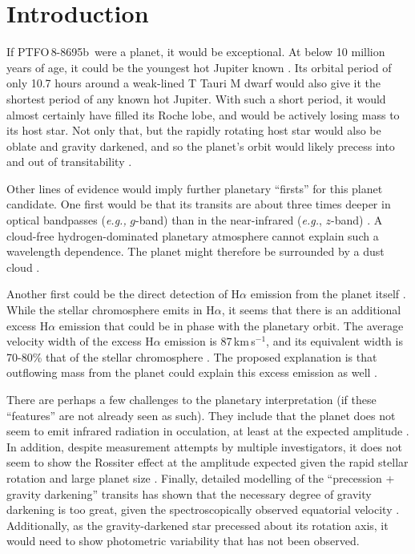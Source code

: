 \documentclass[12pt,twocolumn,tighten]{aastex62}
\newcommand{\ptfob}{PTFO$\,$8-8695b}
\begin{document}

\section{Introduction}
If \ptfob\ were a planet, it would be exceptional.  At below 10
million years of age, it could be the youngest hot Jupiter known
\citep{van_eyken_ptf_2012}.  Its orbital period of only 10.7 hours
around a weak-lined T Tauri M dwarf would also give it the shortest
period of any known hot Jupiter.  With such a short period, it would
almost certainly have filled its Roche lobe, and would be actively
losing mass to its host star.  Not only that, but the rapidly rotating
host star would also be oblate and gravity darkened, and so the
planet's orbit would likely precess into and out of transitability
\citep{barnes_measurement_2013,ciardi_followup_2015,kamiaka_revisiting_2015}. 

Other lines of evidence would imply further planetary ``firsts'' for
this planet candidate.  One first would be that its transits are about
three times deeper in optical bandpasses ({\it e.g.,} $g$-band) than
in the near-infrared ({\it e.g.}, $z$-band)
\citep{onitsuka_multicolor_2017,tanimoto_evidence_2020}.  A cloud-free
hydrogen-dominated planetary atmosphere cannot explain such a
wavelength dependence.  The planet might therefore be surrounded by a
dust cloud \citep{tanimoto_evidence_2020}.  

Another first could be the direct detection of H$\alpha$ emission from
the planet itself \citep{johnskrull_h_2016}.  While the stellar
chromosphere emits in H$\alpha$, it seems that there is an additional
excess H$\alpha$ emission that could be in phase with the planetary
orbit.  The average velocity width of the excess H$\alpha$ emission is
87$\,$km$\,$s$^{-1}$, and its equivalent width is 70-80\% that of the
stellar chromosphere \citep{johnskrull_h_2016}.  The proposed
explanation is that outflowing mass from the planet could explain this
excess emission as well \citep{johnskrull_h_2016}.

There are perhaps a few challenges to the planetary interpretation (if
these ``features'' are not already seen as such).  They include that
the planet does not seem to emit infrared radiation in occulation, at
least at the expected amplitude \citep{yu_tests_2015}.  In
addition, despite measurement attempts by multiple investigators, it
does not seem to show the Rossiter effect at the amplitude expected
given the rapid stellar rotation and large planet size
\citep{yu_tests_2015,ciardi_followup_2015}.  Finally, detailed
modelling of the ``precession + gravity darkening'' transits has shown
that the necessary degree of gravity darkening is too great, given the
spectroscopically observed equatorial velocity
\citep{howarth_reappraisal_2016}.  Additionally, as the
gravity-darkened star precessed about its rotation axis, it would need
to show photometric variability that has not been observed.
\end{document}
